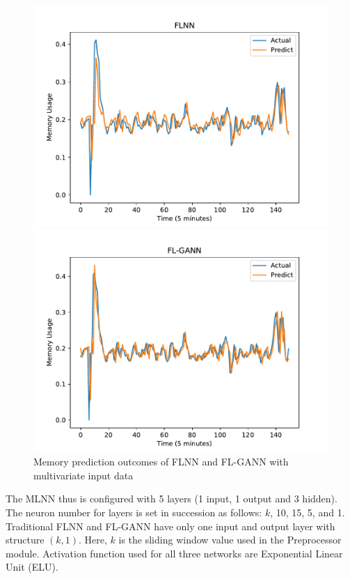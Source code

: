 \documentclass[conference]{IEEEtran}
\begin{document}
\begin{figure}[h]
	\centering
	\begin{minipage}[t]{8cm}
		\centering
		\includegraphics[width=0.8\textwidth =0.2cm 0.2cm 0.2cm 0.2cm]{images/multi_ram_flnn.pdf}
	\end{minipage}
	\hspace{0.5cm}
	\begin{minipage}[t]{8cm}
		\centering
		\includegraphics[width=0.8\textwidth =0.2cm 0.2cm 0.2cm 0.2cm]{images/multi_ram_flgann.pdf}
	\end{minipage}
	\caption{Memory prediction outcomes of FLNN and FL-GANN with multivariate input data} 
	\label{tn1_multi_RAM}
\end{figure}

The MLNN thus is configured with 5 layers (1 input, 1 output and 3 hidden). The neuron number for layers is set in succession as follows: $k$, 10, 15, 5, and 1. Traditional FLNN and FL-GANN have only one input and output layer with structure $(k, 1)$. Here, $k$ is the sliding window value used in the Preprocessor module. Activation function used for all three networks are Exponential Linear Unit (ELU). 
\end{document}
